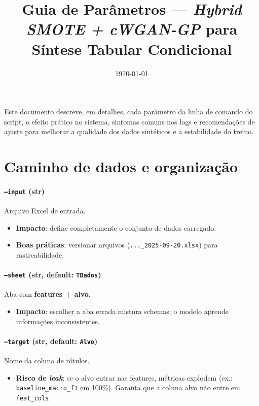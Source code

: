 \documentclass[11pt,a4paper]{article}
\title{Guia de Parâmetros --- \textit{Hybrid SMOTE + cWGAN-GP} para Síntese Tabular Condicional}
\author{}
\date{\today}
\begin{document}
\maketitle

Este documento descreve, em detalhes, cada parâmetro da linha de comando do script, o efeito prático no sistema, sintomas comuns nos logs e recomendações de ajuste para melhorar a qualidade dos dados sintéticos e a estabilidade do treino.

\section{Caminho de dados e organização}

\paragraph{\texttt{--input} (str)} Arquivo Excel de entrada.
\begin{itemize}[leftmargin=1.2em]
  \item \textbf{Impacto}: define completamente o conjunto de dados carregado.
  \item \textbf{Boas práticas}: versionar arquivos (\verb|..._2025-09-20.xlsx|) para rastreabilidade.
\end{itemize}

\paragraph{\texttt{--sheet} (str, default: \texttt{TDados})} Aba com \textbf{features + alvo}.
\begin{itemize}[leftmargin=1.2em]
  \item \textbf{Impacto}: escolher a aba errada mistura schemas; o modelo aprende informações inconsistentes.
\end{itemize}

\paragraph{\texttt{--target} (str, default: \texttt{Alvo})} Nome da coluna de rótulos.
\begin{itemize}[leftmargin=1.2em]
  \item \textbf{Risco de \emph{leak}}: se o alvo entrar nas features, métricas explodem (ex.: \texttt{baseline\_macro\_f1} em 100\%). Garanta que a coluna alvo não entre em \texttt{feat\_cols}.
\end{itemize}
\end{document}
